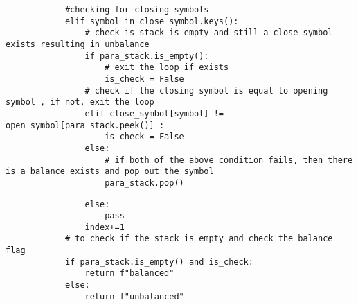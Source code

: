 \documentclass{beamer}
\begin{document}
\begin{frame}[fragile]    
    \begin{lstlisting}
            #checking for closing symbols
            elif symbol in close_symbol.keys():
                # check is stack is empty and still a close symbol exists resulting in unbalance
                if para_stack.is_empty():
                    # exit the loop if exists
                    is_check = False
                # check if the closing symbol is equal to opening symbol , if not, exit the loop
                elif close_symbol[symbol] != open_symbol[para_stack.peek()] :
                    is_check = False 
                else:
                    # if both of the above condition fails, then there is a balance exists and pop out the symbol
                    para_stack.pop()
    \end{lstlisting}
\end{frame}
    
\begin{frame}[fragile]
    \begin{lstlisting}
                else:
                    pass
                index+=1
            # to check if the stack is empty and check the balance flag 
            if para_stack.is_empty() and is_check:
                return f"balanced"
            else:
                return f"unbalanced"

    \end{lstlisting}
\end{frame}
    
\end{document}
